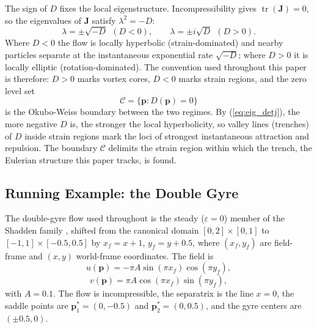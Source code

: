 \documentclass[lettersize,journal]{IEEEtran}
\begin{document}
The sign of $D$ fixes the local eigenstructure. Incompressibility gives
$\operatorname{tr}(\mathbf{J}) = 0$, so the eigenvalues of $\mathbf{J}$
satisfy $\lambda^2 = -D$:
\begin{equation}
    \lambda = \pm\sqrt{-D} \ \ (D < 0), \qquad
    \lambda = \pm i\sqrt{D} \ \ (D > 0).
    \label{eq:eig_detj}
\end{equation}
Where $D < 0$ the flow is locally hyperbolic (strain-dominated) and
nearby particles separate at the instantaneous exponential rate
$\sqrt{-D}$; where $D > 0$ it is locally elliptic (rotation-dominated).
The convention used throughout this paper is therefore: $D > 0$ marks
vortex cores, $D < 0$ marks strain regions, and the zero level set
\begin{equation}
    \mathcal{C} = \{\mathbf{p} : D(\mathbf{p}) = 0\}
    \label{eq:ow_boundary}
\end{equation}
is the Okubo-Weiss boundary between the two regimes. By
(\ref{eq:eig_detj}), the more negative $D$ is, the stronger the local
hyperbolicity, so valley lines (trenches) of $D$ inside strain regions
mark the loci of strongest instantaneous attraction and repulsion. The
boundary $\mathcal{C}$ delimits the strain region within which the
trench, the Eulerian structure this paper tracks, is found.

\subsection{Running Example: the Double Gyre}
\label{sec:dg_example}

The double-gyre flow used throughout is the steady ($\varepsilon = 0$)
member of the Shadden family \cite{8}, shifted from the canonical domain
$[0,2] \times [0,1]$ to $[-1,1] \times [-0.5, 0.5]$ by
$x_f = x + 1$, $y_f = y + 0.5$, where $(x_f, y_f)$ are field-frame and
$(x, y)$ world-frame coordinates. The field is
\begin{equation}
    u(\mathbf{p}) = -\pi A \sin(\pi x_f) \cos(\pi y_f), \label{eq:dg_u}
\end{equation}
\begin{equation}
    v(\mathbf{p}) = \pi A \cos(\pi x_f) \sin(\pi y_f), \label{eq:dg_v}
\end{equation}
with $A = 0.1$. The flow is incompressible, the separatrix is the line
$x = 0$, the saddle points are $\mathbf{p}^*_1 = (0, -0.5)$ and
$\mathbf{p}^*_2 = (0, 0.5)$, and the gyre centers are $(\pm 0.5, 0)$.
\end{document}
